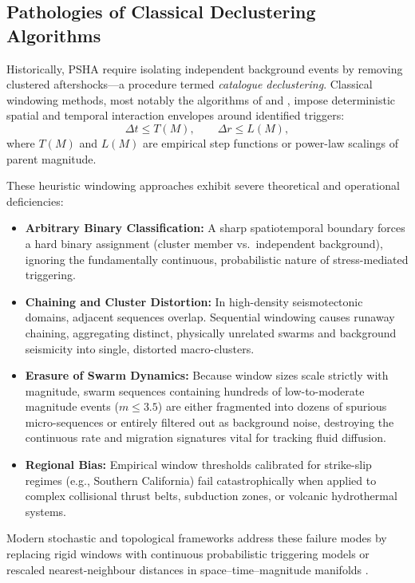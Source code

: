 \subsection{Pathologies of Classical Declustering Algorithms}
\label{subsec:declustering_limitations}

Historically, \ac{PSHA} require isolating independent background
events by removing clustered aftershocks—a procedure termed \emph{catalogue
declustering}. Classical windowing methods, most notably the
algorithms of \citet{gardner1974} and \citet{reasenberg1985}, impose
deterministic spatial and temporal interaction envelopes around
identified triggers:
\begin{equation}
  \Delta t \le T(M), \qquad \Delta r \le L(M),
  \label{eq:classical_window}
\end{equation}
where $T(M)$ and $L(M)$ are empirical step functions or power-law
scalings of parent magnitude.

These heuristic windowing approaches exhibit severe theoretical and
operational deficiencies:
\begin{itemize}[noitemsep,topsep=2pt]
  \item \textbf{Arbitrary Binary Classification:} A sharp
    spatiotemporal boundary forces a hard binary assignment (cluster
    member vs.\ independent background), ignoring the fundamentally
    continuous, probabilistic nature of stress-mediated triggering.
  \item \textbf{Chaining and Cluster Distortion:} In high-density
    seismotectonic domains, adjacent sequences overlap. Sequential
    windowing causes runaway chaining, aggregating distinct,
    physically unrelated swarms and background seismicity into
    single, distorted macro-clusters.
  \item \textbf{Erasure of Swarm Dynamics:} Because window sizes
    scale strictly with magnitude, swarm sequences containing
    hundreds of low-to-moderate magnitude events ($m \le \num{3.5}$) are
    either fragmented into dozens of spurious micro-sequences or
    entirely filtered out as background noise, destroying the
    continuous rate and migration signatures vital for tracking
    fluid diffusion.
  \item \textbf{Regional Bias:} Empirical window thresholds
    calibrated for strike-slip regimes (e.g., Southern California)
    fail catastrophically when applied to complex collisional thrust
    belts, subduction zones, or volcanic hydrothermal systems.
\end{itemize}
Modern stochastic and topological frameworks address these failure modes
by replacing rigid windows with continuous probabilistic triggering models
\parencite{zhuang2002,marsan2008} or rescaled nearest-neighbour distances
in space--time--magnitude manifolds
\parencite{baiesi2004,zaliapin2008,zaliapin2013}.

